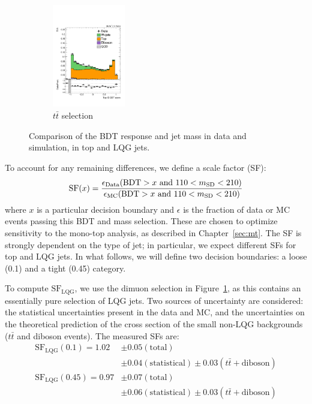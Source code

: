 \begin{figure}[]
\begin{center}
\begin{subfigure}[t]{\textwidth}
\begin{center}
            \includegraphics[width=0.35\textwidth]{figures/toptagging/sf/singlemuontop_top_ecf_bdt.pdf}
            \caption{$t\bar{t}$ selection}
    \end{center}
        \end{subfigure}
        \caption{Comparison of the BDT response and jet mass in data and simulation, in top and LQG jets.}
        \label{fig:jets:bdtdist}
    \end{center}
\end{figure}

To account for any remaining differences, we define a scale factor (SF):
\begin{equation}
    \mathrm{SF}(x) = \frac{\epsilon_\mathrm{Data}(\mathrm{BDT}>x \text{ and }110<m_{\mathrm{SD}}<210)}{\epsilon_\mathrm{MC}(\mathrm{BDT}>x \text{ and }110<m_{\mathrm{SD}}<210)}
\end{equation}
where $x$ is a particular decision boundary and $\epsilon$ is the fraction of data or MC events passing this BDT  and mass selection.
These are chosen to optimize sensitivity to the mono-top analysis, as described in Chapter~\ref{sec:mt}.
The SF is strongly dependent on the type of jet; in particular, we expect different SFs for top and LQG jets.
In what follows, we will define two decision boundaries: a loose (0.1) and a tight (0.45) category.

To compute $\mathrm{SF}_\mathrm{LQG}$, we use the dimuon selection in Figure~\ref{fig:jets:bdtdist}, as this contains an essentially pure selection of LQG jets.
Two sources of uncertainty are considered: the statistical uncertainties present in the data and MC, and the uncertainties on the theoretical prediction of the cross section of the small non-LQG backgrounds ($t\bar{t}$ and diboson events).
The measured SFs are:
\begin{align}
    \mathrm{SF}_\mathrm{LQG}(0.1) = 1.02 & \pm 0.05 (\mathrm{total}) \nonumber \\ 
                                         & \pm 0.04 (\mathrm{statistical}) \pm 0.03 (t\bar{t}+\mathrm{diboson}) \nonumber \\ 
    \mathrm{SF}_\mathrm{LQG}(0.45) = 0.97 & \pm 0.07 (\mathrm{total}) \nonumber \\ 
                                         & \pm 0.06 (\mathrm{statistical}) \pm 0.03 (t\bar{t}+\mathrm{diboson})
\end{align}

